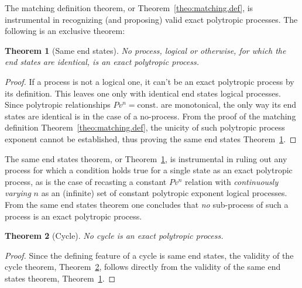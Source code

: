 \documentclass[fleqn,11pt]{SelfArx}
\newtheorem{theorem}{Theorem}
\begin{document}
    The matching definition theorem, or Theorem~\ref{theo:matching.def}, is instrumental in
    recognizing (and proposing) valid exact polytropic processes. The following is an exclusive
    theorem:

    \begin{theorem}[Same end states]\label{theo:same.end.states}
        No process, logical or otherwise, for which the end states are identical, is an exact
        polytropic process.
    \end{theorem}

    \begin{proof}
        If a process is not a logical one, it can't  be  an  exact  polytropic  process  by  its
        definition. This leaves one only with identical  end  states  logical  processes.  Since
        polytropic relationships $Pv^n = \mbox{const.}$ are monotonical, the only  way  its  end
        states are identical is in the case of a no-process. From  the  proof  of  the  matching
        definition Theorem~\ref{theo:matching.def},  the  unicity  of  such  polytropic  process
        exponent   cannot   be   established,    thus    proving    the    same    end    states
        Theorem~\ref{theo:same.end.states}.
    \end{proof}

    The same end states  theorem,  or  Theorem~\ref{theo:same.end.states},  is  instrumental  in
    ruling out any process for which a condition holds true for  a  single  state  as  an  exact
    polytropic  process,  as  is  the  case  of  recasting  a  constant  $Pv^n$  relation   with
    \emph{continuously varying} $n$ as an (infinite) set of constant polytropic exponent logical
    processes. From the same end states theorem one concludes that \emph{no} sub-process of such
    a process is an exact polytropic process.

    \begin{theorem}[Cycle]\label{theo:cycle}
        No cycle is an exact polytropic process.
    \end{theorem}

    \begin{proof}
        Since the defining feature of a cycle is same end states,  the  validity  of  the  cycle
        theorem, Theorem~\ref{theo:cycle}, follows directly from the validity of  the  same  end
        states theorem, Theorem~\ref{theo:same.end.states}.
    \end{proof}

\end{document}

